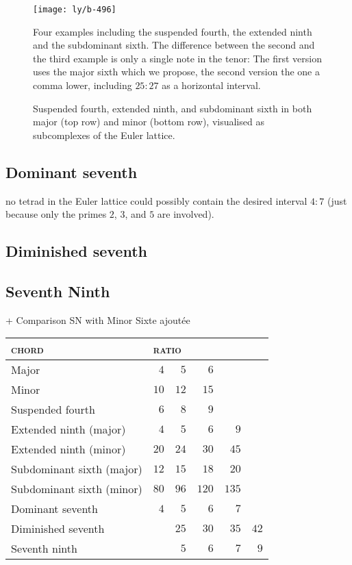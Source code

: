 \documentclass[british,11pt]{scrartcl}
\begin{document}
\begin{figure}
  \centering
  \texttt{[image: ly/b-496]}
  \caption{Four examples including the suspended fourth, the extended ninth and
    the subdominant sixth. The difference between the second and the third
    example is only a single note in the tenor: The first version uses the major
    sixth which we propose, the second version the one a comma lower, including
    $25:27$ as a horizontal interval.}\label{fig:496}
\end{figure}

\begin{figure}
  \centering
  
  \caption{Suspended fourth, extended ninth, and subdominant sixth in both major
    (top row) and minor (bottom row), visualised as subcomplexes of the Euler
    lattice.}\label{fig:chordLines}
\end{figure}

\subsection{Dominant seventh}


no tetrad in the Euler lattice could possibly contain the
desired interval $4:7$ (just because only the primes $2$, $3$, and $5$ are
involved).


\subsection{Diminished seventh}


\subsection{Seventh Ninth}

+ Comparison SN with Minor Sixte ajoutée

\begin{table}
  \centering
  \begin{tabular}{lrrrrr}
    \toprule
    \textsc{chord} & \multicolumn{4}{l}{\textsc{ratio}}\\
    \midrule
    Major                     & $4$  & $5$  & $6$\\
    Minor                     & $10$ & $12$ & $15$\\
    Suspended fourth          & $6$  & $8$  & $9$\\
    Extended ninth (major)   & $4$  & $5$  & $6$  & $9$\\
    Extended ninth (minor)   & $20$ & $24$ & $30$ & $45$\\
    Subdominant sixth (major) & $12$ & $15$ & $18$ & $20$\\
    Subdominant sixth (minor) & $80$ & $96$ & $120$ & $135$\\
    Dominant seventh          & $4$  & $5$  & $6$  & $7$\\
    Diminished seventh        &      & $25$ & $30$ & $35$ & $42$\\
    Seventh ninth             &      & $5$  & $6$  & $7$  & $9$\\
    \bottomrule
  \end{tabular}
\end{table}
\end{document}

